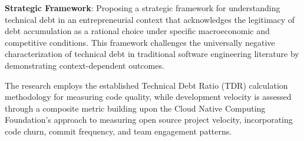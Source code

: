 \textbf{Strategic Framework}: Proposing a strategic framework for understanding technical debt in an entrepreneurial context that acknowledges the legitimacy of debt accumulation as a rational choice under specific macroeconomic and competitive conditions. This framework challenges the universally negative characterization of technical debt in traditional software engineering literature by demonstrating context-dependent outcomes.

The research employs the established Technical Debt Ratio (\acs{TDR}) calculation methodology for measuring code quality, while development velocity is assessed through a composite metric building upon the Cloud Native Computing Foundation's approach to measuring open source project velocity, incorporating code churn, commit frequency, and team engagement patterns.

\vspace{1cm}

